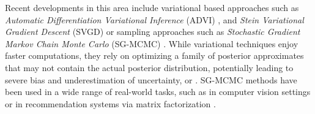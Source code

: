 Recent developments in this area include variational based approaches such as \emph{Automatic Differentiation Variational Inference} (ADVI) \cite{blei2017variational}, and \emph{Stein Variational Gradient Descent} (SVGD)  \cite{liu2016stein} or sampling approaches such as \emph{Stochastic Gradient Markov Chain Monte Carlo} (SG-MCMC) \cite{ma2015complete}. While variational techniques enjoy faster computations, they rely on optimizing a family of posterior approximates that may not contain the actual posterior distribution, potentially leading to severe bias and underestimation of uncertainty, \cite{pmlr-v80-yao18a} or \cite{48127}. SG-MCMC methods have been used in a wide range of real-world tasks, such as in computer vision settings \cite{7780980} or in recommendation systems via matrix factorization \cite{7952555}.%

